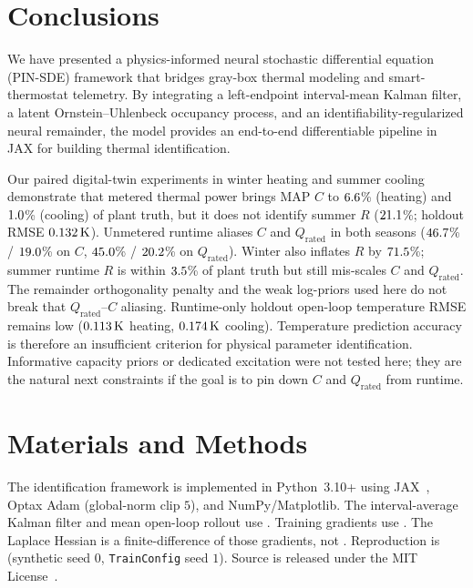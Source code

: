 \documentclass[11pt,letterpaper]{article}
\begin{document}
\section{Conclusions}
\label{sec:conclusion}
We have presented a physics-informed neural stochastic differential equation (PIN-SDE) framework that bridges gray-box thermal modeling and smart-thermostat telemetry. By integrating a left-endpoint interval-mean Kalman filter, a latent Ornstein--Uhlenbeck occupancy process, and an identifiability-regularized neural remainder, the model provides an end-to-end differentiable pipeline in JAX for building thermal identification.

Our paired digital-twin experiments in winter heating and summer cooling demonstrate that metered thermal power brings MAP $C$ to $6.6$\% (heating) and $1.0$\% (cooling) of plant truth, but it does not identify summer $R$ ($21.1$\%; holdout RMSE $0.132\,\mathrm{K}$). Unmetered runtime aliases $C$ and $Q_\mathrm{rated}$ in both seasons ($46.7$\% / $19.0$\% on $C$, $45.0$\% / $20.2$\% on $Q_\mathrm{rated}$). Winter also inflates $R$ by $71.5$\%; summer runtime $R$ is within $3.5$\% of plant truth but still mis-scales $C$ and $Q_\mathrm{rated}$. The remainder orthogonality penalty and the weak log-priors used here do not break that $Q_\mathrm{rated}$--$C$ aliasing. Runtime-only holdout open-loop temperature RMSE remains low ($0.113\,\mathrm{K}$ heating, $0.174\,\mathrm{K}$ cooling). Temperature prediction accuracy is therefore an insufficient criterion for physical parameter identification. Informative capacity priors or dedicated excitation were not tested here; they are the natural next constraints if the goal is to pin down $C$ and $Q_\mathrm{rated}$ from runtime.

\section*{Materials and Methods}
\label{sec:methods}
The identification framework is implemented in Python~3.10+ using JAX~\cite{bradbury2018}, Optax Adam (global-norm clip $5$), and NumPy/Matplotlib. The interval-average Kalman filter and mean open-loop rollout use . Training gradients use . The Laplace Hessian is a finite-difference of those gradients, not . Reproduction is  (synthetic seed $0$, \texttt{TrainConfig} seed $1$). Source is released under the MIT License~\cite{yang2026pinde}.
\end{document}
